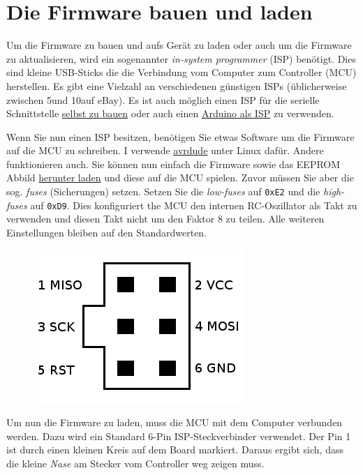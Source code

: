 \documentclass[10pt, a4paper,twoside]{scrartcl}
\begin{document}
\cleardoublepage 
\section{Die Firmware bauen und laden} \label{sec:fw}
Um die Firmware zu bauen und aufs Gerät zu laden oder auch um die Firmware zu aktualisieren, wird ein sogenannter \emph{in-system programmer} (ISP) benötigt. Dies sind kleine USB-Sticks die die Verbindung vom Computer zum Controller (MCU) herstellen. Es gibt eine Vielzahl an verschiedenen günstigen ISPs (üblicherweise zwischen 5\EUR und 10\EUR auf eBay). Es ist auch möglich einen ISP für die serielle Schnittstelle \href{http://www.lancos.com/siprogsch.html}{selbst zu bauen} oder auch einen \href{https://www.arduino.cc/en/Tutorial/BuiltInExamples/ArduinoISP}{Arduino als ISP} zu verwenden.

Wenn Sie nun einen ISP besitzen, benötigen Sie etwas Software um die Firmware auf die MCU zu schreiben. I verwende \href{https://www.nongnu.org/avrdude/}{avrdude} unter Linux dafür. Andere funktionieren auch. Sie können nun einfach die Firmware sowie das EEPROM Abbild \href{https://github.com/hmatuschek/cwtrx/releases}{herunter laden} und diese auf die MCU spielen. Zuvor müssen Sie aber die sog. \emph{fuses} (Sicherungen) setzen. Setzen Sie die \emph{low-fuses} auf \texttt{0xE2} und die \emph{high-fuses} auf \texttt{0xD9}. Dies konfiguriert the MCU den internen RC-Oszillator als Takt zu verwenden und diesen Takt nicht um den Faktor 8 zu teilen. Alle weiteren Einstellungen bleiben auf den Standardwerten.

\begin{figure}
  \includegraphics[width=\linewidth]{fig/icsp_6pin.png}
\end{figure}
Um nun die Firmware zu laden, muss die MCU mit dem Computer verbunden werden. Dazu wird ein Standard 6-Pin ISP-Steckverbinder verwendet. Der Pin 1 ist durch einen kleinen Kreis auf dem Board markiert. Daraus ergibt sich, dass die kleine \emph{Nase} am Stecker vom Controller weg zeigen muss.
\end{document}
